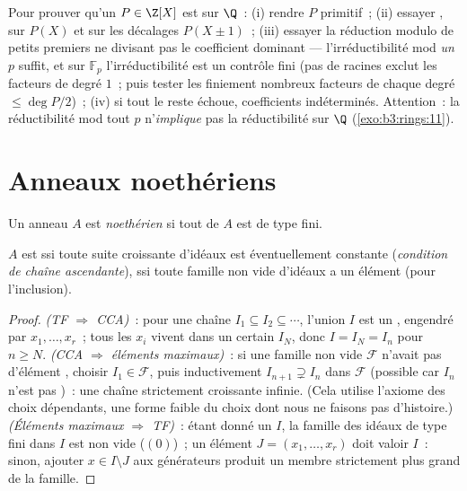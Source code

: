 \begin{method}\label{met:b3:rings:irreducibility}
Pour prouver qu'un $P \in \Z[X]$ est  sur $\Q$~:
(i) rendre $P$ primitif~; (ii) essayer , sur $P(X)$ et
sur les décalages $P(X \pm 1)$~; (iii) essayer la réduction
modulo de petits premiers ne divisant pas le coefficient
dominant --- l'irréductibilité mod \emph{un} $p$ suffit, et sur
$\mathbb F_p$ l'irréductibilité est un contrôle fini (pas de
racines exclut les facteurs de degré $1$~; puis tester les
finiement nombreux facteurs de chaque degré $\leq \deg P/2$)~;
(iv) si tout le reste échoue, coefficients indéterminés.
Attention~: la réductibilité mod tout $p$ n'\emph{implique}
pas la réductibilité sur $\Q$ (\cref{exo:b3:rings:11}).
\end{method}

\section{Anneaux noethériens}

\begin{definition}\label{def:b3:rings:noetherian}
Un anneau $A$ est \emph{noethérien} si
tout  de $A$ est de type fini.
\end{definition}

\begin{proposition}\label{prop:b3:rings:noethacc}
$A$ est  ssi toute suite croissante d'idéaux est
éventuellement constante (\emph{condition de chaîne
ascendante}), ssi toute famille non vide d'idéaux a un élément
 (pour l'inclusion).
\end{proposition}

\begin{proof}
\emph{(TF $\Rightarrow$ CCA)}~: pour une chaîne $I_1 \subseteq
I_2 \subseteq \cdots$, l'union $I$ est un , engendré par
$x_1, \dots, x_r$~; tous les $x_i$ vivent dans un certain $I_N$,
donc $I = I_N = I_n$ pour $n \geq N$. \emph{(CCA $\Rightarrow$
éléments maximaux)}~: si une famille non vide $\mathcal F$
n'avait pas d'élément , choisir $I_1 \in \mathcal F$,
puis inductivement $I_{n+1} \supsetneq I_n$ dans $\mathcal F$
(possible car $I_n$ n'est pas )~: une chaîne strictement
croissante infinie. (Cela utilise l'axiome des choix dépendants,
une forme faible du choix dont nous ne faisons pas d'histoire.)
\emph{(Éléments maximaux $\Rightarrow$ TF)}~: étant donné un
 $I$, la famille des idéaux de type fini  dans $I$
est non vide ($(0)$)~; un élément  $J = (x_1, \dots,
x_r)$ doit valoir $I$~: sinon, ajouter $x \in I \setminus J$ aux
générateurs produit un membre strictement plus grand de la
famille.
\end{proof}

